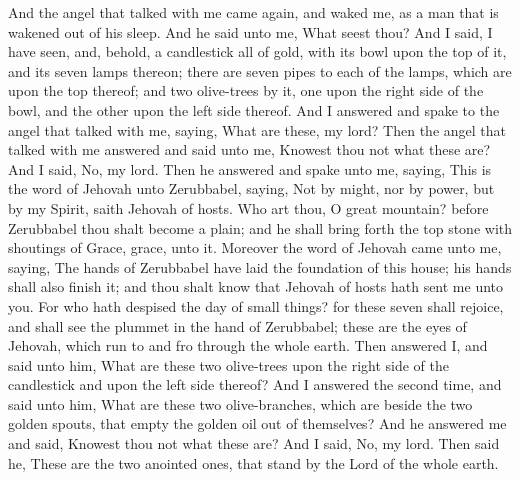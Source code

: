 And the angel that talked with me came again, and waked me, as a man that is wakened out of his sleep. And he said unto me, What seest thou? And I said, I have seen, and, behold, a candlestick all of gold, with its bowl upon the top of it, and its seven lamps thereon; there are seven pipes to each of the lamps, which are upon the top thereof; and two olive-trees by it, one upon the right side of the bowl, and the other upon the left side thereof. And I answered and spake to the angel that talked with me, saying, What are these, my lord? Then the angel that talked with me answered and said unto me, Knowest thou not what these are? And I said, No, my lord. Then he answered and spake unto me, saying, This is the word of Jehovah unto Zerubbabel, saying, Not by might, nor by power, but by my Spirit, saith Jehovah of hosts. Who art thou, O great mountain? before Zerubbabel thou shalt become a plain; and he shall bring forth the top stone with shoutings of Grace, grace, unto it. Moreover the word of Jehovah came unto me, saying, The hands of Zerubbabel have laid the foundation of this house; his hands shall also finish it; and thou shalt know that Jehovah of hosts hath sent me unto you. For who hath despised the day of small things? for these seven shall rejoice, and shall see the plummet in the hand of Zerubbabel; these are the eyes of Jehovah, which run to and fro through the whole earth.  Then answered I, and said unto him, What are these two olive-trees upon the right side of the candlestick and upon the left side thereof? And I answered the second time, and said unto him, What are these two olive-branches, which are beside the two golden spouts, that empty the golden oil out of themselves? And he answered me and said, Knowest thou not what these are? And I said, No, my lord. Then said he, These are the two anointed ones, that stand by the Lord of the whole earth. 

